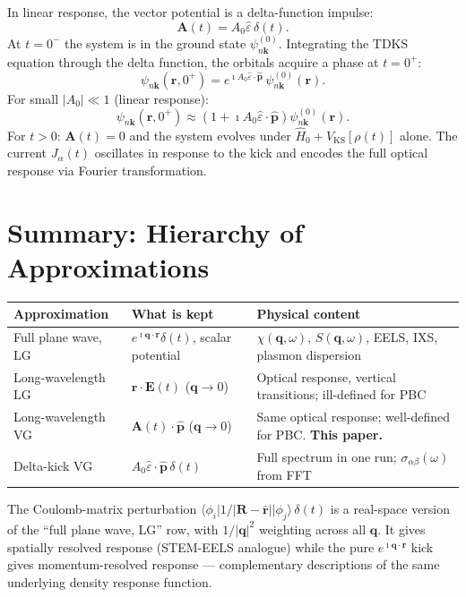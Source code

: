 \documentclass[11pt]{article}
\newcommand{\iunit}{\imath}          %
\newcommand{\Avec}{\mathbf{A}}
\newcommand{\phat}{\hat{\mathbf{p}}}
\begin{document}
In linear response, the vector potential is a delta-function impulse:
\begin{equation}
  \Avec(t) = A_0\hat{\varepsilon}\,\delta(t).
  \label{eq:VG-kick}
\end{equation}
At $t=0^-$ the system is in the ground state $\psi_{n\mathbf{k}}^{(0)}$.
Integrating the TDKS equation through the delta function,
the orbitals acquire a phase at $t=0^+$:
\begin{equation}
  \psi_{n\mathbf{k}}(\mathbf{r},0^+)
  = e^{\iunit A_0\hat{\varepsilon}\cdot\phat}\,
    \psi_{n\mathbf{k}}^{(0)}(\mathbf{r}).
  \label{eq:kick-phase}
\end{equation}
For small $|A_0|\ll 1$ (linear response):
\begin{equation}
  \psi_{n\mathbf{k}}(\mathbf{r},0^+)
  \approx \left(1 + \iunit A_0\hat{\varepsilon}\cdot\phat\right)
  \psi_{n\mathbf{k}}^{(0)}(\mathbf{r}).
  \label{eq:kick-linear}
\end{equation}
For $t>0$: $\Avec(t)=0$ and the system evolves under
$\hat{H}_0 + V_\mathrm{KS}[\rho(t)]$ alone.
The current $J_\alpha(t)$ oscillates in response to the kick and
encodes the full optical response via Fourier transformation.

\section{Summary: Hierarchy of Approximations}

\begin{center}
\begin{tabular}{p{3.2cm}p{4.8cm}p{5cm}}
\hline
\textbf{Approximation} & \textbf{What is kept} & \textbf{Physical content} \\
\hline
Full plane wave, LG
& $e^{\iunit\mathbf{q}\cdot\mathbf{r}}\delta(t)$,
  scalar potential
& $\chi(\mathbf{q},\omega)$, $S(\mathbf{q},\omega)$,
  EELS, IXS, plasmon dispersion \\[4pt]
Long-wavelength LG
& $\mathbf{r}\cdot\mathbf{E}(t)$ ($\mathbf{q}\to0$)
& Optical response, vertical transitions;
  ill-defined for PBC \\[4pt]
Long-wavelength VG
& $\Avec(t)\cdot\phat$ ($\mathbf{q}\to0$)
& Same optical response; well-defined for PBC.
  \textbf{This paper.} \\[4pt]
Delta-kick VG
& $A_0\hat{\varepsilon}\cdot\phat\,\delta(t)$
& Full spectrum in one run;
  $\sigma_{\alpha\beta}(\omega)$ from FFT \\
\hline
\end{tabular}
\end{center}

\vspace{12pt}

The Coulomb-matrix perturbation
$\langle\phi_i|1/|\mathbf{R}-\hat{\mathbf{r}}||\phi_j\rangle\,\delta(t)$
is a real-space version of the ``full plane wave, LG'' row,
with $1/|\mathbf{q}|^2$ weighting across all $\mathbf{q}$.
It gives spatially resolved response (STEM-EELS analogue) while
the pure $e^{\iunit\mathbf{q}\cdot\mathbf{r}}$ kick gives
momentum-resolved response --- complementary descriptions of the
same underlying density response function.
\end{document}
